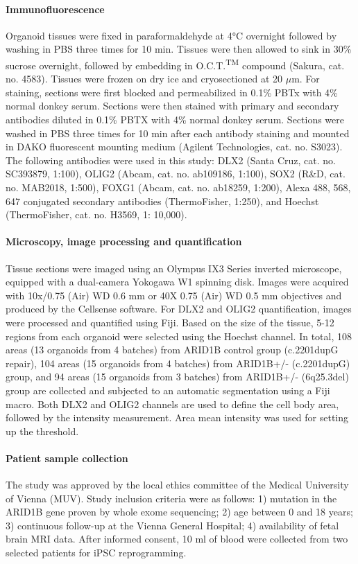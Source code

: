 \paragraph{Immunofluorescence}
Organoid tissues were fixed in paraformaldehyde at 4°C overnight followed by washing in PBS three times for 10 min. Tissues were then allowed to sink in 30\% sucrose overnight, followed by embedding in O.C.T.\textsuperscript{TM} compound (Sakura, cat. no. 4583). Tissues were frozen on dry ice and cryosectioned at 20 $\mu$m. For staining, sections were first blocked and permeabilized in 0.1\% PBTx with 4\% normal donkey serum. Sections were then stained with primary and secondary antibodies diluted in 0.1\% PBTX with 4\% normal donkey serum. Sections were washed in PBS three times for 10 min after each antibody staining and mounted in DAKO fluorescent mounting medium (Agilent Technologies, cat. no. S3023). The following antibodies were used in this study: DLX2 (Santa Cruz, cat. no. SC393879, 1:100), OLIG2 (Abcam, cat. no. ab109186, 1:100), SOX2 (R\&D, cat. no. MAB2018, 1:500), FOXG1 (Abcam, cat. no. ab18259, 1:200), Alexa 488, 568, 647 conjugated secondary antibodies (ThermoFisher, 1:250), and Hoechst (ThermoFisher, cat. no. H3569, 1: 10,000).

\paragraph{Microscopy, image processing and quantification}
Tissue sections were imaged using an Olympus IX3 Series inverted microscope, equipped with a dual-camera Yokogawa W1 spinning disk. Images were acquired with 10x/0.75 (Air) WD 0.6 mm or 40X 0.75 (Air) WD 0.5 mm objectives and produced by the Cellsense software. 
For DLX2 and OLIG2 quantification, images were processed and quantified using Fiji. Based on the size of the tissue, 5-12 regions from each organoid were selected using the Hoechst channel. In total, 108 areas (13 organoids from 4 batches) from ARID1B control group (c.2201dupG repair), 104 areas (15 organoids from 4 batches) from ARID1B+/- (c.2201dupG) group, and 94 areas (15 organoids from 3 batches) from ARID1B+/- (6q25.3del) group are collected and subjected to an automatic segmentation using a Fiji macro. Both DLX2 and OLIG2 channels are used to define the cell body area, followed by the intensity measurement. Area mean intensity was used for setting up the threshold.   

\paragraph{Patient sample collection}
The study was approved by the local ethics committee of the Medical University of Vienna (MUV). Study inclusion criteria were as follows: 1) mutation in the ARID1B gene proven by whole exome sequencing; 2) age between 0 and 18 years; 3) continuous follow-up at the Vienna General Hospital; 4) availability of fetal brain MRI data. After informed consent, 10 ml of blood were collected from two selected patients for iPSC reprogramming.

